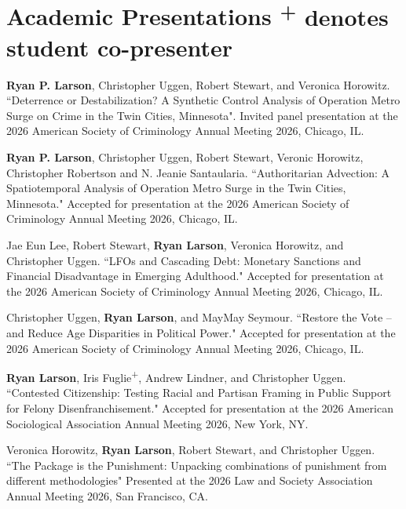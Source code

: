 \documentclass[letterpaper]{article}
\newenvironment{publist}{%
  \begin{list}{}{%
    \setlength{\leftmargin}{0cm}   %
    \setlength{\labelwidth}{2cm}     %
    \setlength{\labelsep}{0.5cm}     %
  }%
}{%
  \end{list}%
}
\begin{document}
\section*{\textbf{Academic Presentations} \scriptsize{\textsuperscript{+} denotes student co-presenter}} 

\begin{publist}

\item [\textbf{2026}] \textbf{Ryan P. Larson}, Christopher Uggen, Robert Stewart, and Veronica Horowitz. ``Deterrence or Destabilization? A Synthetic Control Analysis of Operation Metro Surge on Crime in the Twin Cities, Minnesota". Invited panel presentation at the 2026 American Society of Criminology Annual Meeting 2026, Chicago, IL. 

\item \textbf{Ryan P. Larson}, Christopher Uggen, Robert Stewart, Veronic Horowitz, Christopher Robertson and N. Jeanie Santaularia. ``Authoritarian Advection: A Spatiotemporal Analysis of Operation Metro Surge in the Twin Cities, Minnesota." Accepted for presentation at the 2026 American Society of Criminology Annual Meeting 2026, Chicago, IL.

\item Jae Eun Lee, Robert Stewart, \textbf{Ryan Larson}, Veronica Horowitz, and Christopher Uggen. ``LFOs and Cascading Debt: Monetary Sanctions and Financial Disadvantage in Emerging Adulthood." Accepted for presentation at the 2026 American Society of Criminology Annual Meeting 2026, Chicago, IL.

\item Christopher Uggen, \textbf{Ryan Larson}, and MayMay Seymour. ``Restore the Vote – and Reduce Age Disparities in Political Power." Accepted for presentation at the 2026 American Society of Criminology Annual Meeting 2026, Chicago, IL.

\item \textbf{Ryan Larson}, Iris Fuglie\textsuperscript{+}, Andrew Lindner, and Christopher Uggen. ``Contested Citizenship: Testing Racial and Partisan Framing in Public Support for Felony Disenfranchisement." Accepted for presentation at the 2026 American Sociological Association Annual Meeting 2026, New York, NY. 

\item Veronica Horowitz, \textbf{Ryan Larson}, Robert Stewart, and Christopher Uggen. ``The Package is the Punishment: Unpacking combinations of punishment from different methodologies" Presented at the 2026 Law and Society Association Annual Meeting 2026, San Francisco, CA. 


\end{publist}
\end{document}

